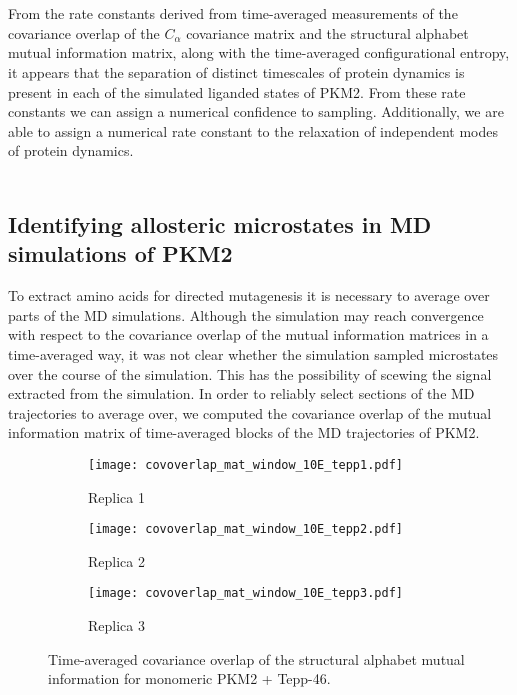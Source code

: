 \documentclass[11pt]{article}
\begin{document}
\\
\\
From the rate constants derived from time-averaged measurements of the covariance overlap of the $C_\alpha$ covariance matrix and the structural alphabet mutual information matrix, along with the time-averaged configurational entropy, it appears that the separation of distinct timescales of protein dynamics is present in each of the simulated liganded states of PKM2. From these rate constants we can assign a numerical confidence to sampling. Additionally, we are able to assign a numerical rate constant to the relaxation of independent modes of protein dynamics.
\\
\\
\subsection*{Identifying allosteric microstates in MD simulations of PKM2} 
To extract amino acids for directed mutagenesis it is necessary to average over parts of the MD simulations. Although the simulation may reach convergence with respect to the covariance overlap of the mutual information matrices in a time-averaged way, it was not clear whether the simulation sampled microstates over the course of the simulation. This has the possibility of scewing the signal extracted from the simulation. In order to reliably select sections of the MD trajectories to average over, we computed the covariance overlap of the mutual information matrix of time-averaged blocks of the MD trajectories of PKM2.   
\begin{figure}[!ht]
\centering
\begin{subfigure}[b]{.4\linewidth}
    \centering
    \texttt{[image: covoverlap\_mat\_window\_10E\_tepp1.pdf]}
    \caption{Replica 1}\label{fig:4a}
  \end{subfigure}%
  \begin{subfigure}[b]{.4\linewidth}
    \centering
    \texttt{[image: covoverlap\_mat\_window\_10E\_tepp2.pdf]}
    \caption{Replica 2}\label{fig:3b}
  \end{subfigure}%
  \begin{subfigure}[b]{.4\linewidth}
    \centering
    \texttt{[image: covoverlap\_mat\_window\_10E\_tepp3.pdf]}
    \caption{Replica 3}\label{fig:3b}
  \end{subfigure}%
\caption{Time-averaged covariance overlap of the structural alphabet mutual information for monomeric PKM2 + Tepp-46.}\label{fig:2}
\end{figure}
\end{document}

